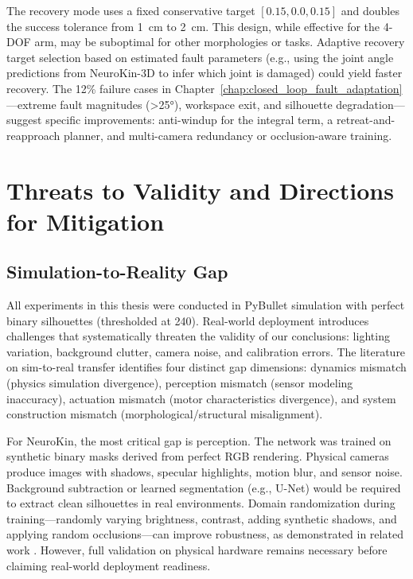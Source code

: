 \documentclass[12pt,a4paper,oneside]{report}
\begin{document}
The recovery mode uses a fixed conservative target $[0.15, 0.0, 0.15]$ and doubles the success tolerance from 1~cm to 2~cm. This design, while effective for the 4-DOF arm, may be suboptimal for other morphologies or tasks. Adaptive recovery target selection based on estimated fault parameters (e.g., using the joint angle predictions from NeuroKin-3D to infer which joint is damaged) could yield faster recovery. The 12\% failure cases in Chapter~\ref{chap:closed_loop_fault_adaptation}---extreme fault magnitudes (>25°), workspace exit, and silhouette degradation---suggest specific improvements: anti-windup for the integral term, a retreat-and-reapproach planner, and multi-camera redundancy or occlusion-aware training.
\section{Threats to Validity and Directions for Mitigation}
\subsection{Simulation-to-Reality Gap}
\label{subsec:simulation_to_reality_gap}

All experiments in this thesis were conducted in PyBullet simulation with perfect binary silhouettes (thresholded at 240). Real-world deployment introduces challenges that systematically threaten the validity of our conclusions: lighting variation, background clutter, camera noise, and calibration errors. The literature on sim-to-real transfer \cite{tan2018simtoreal, aljalbout2026realitygap} identifies four distinct gap dimensions: dynamics mismatch (physics simulation divergence), perception mismatch (sensor modeling inaccuracy), actuation mismatch (motor characteristics divergence), and system construction mismatch (morphological/structural misalignment).

For NeuroKin, the most critical gap is perception. The network was trained on synthetic binary masks derived from perfect RGB rendering. Physical cameras produce images with shadows, specular highlights, motion blur, and sensor noise. Background subtraction or learned segmentation (e.g., U-Net) would be required to extract clean silhouettes in real environments. Domain randomization during training---randomly varying brightness, contrast, adding synthetic shadows, and applying random occlusions---can improve robustness, as demonstrated in related work \cite{rezvani2024robust, qiu2024swim2real}. However, full validation on physical hardware remains necessary before claiming real-world deployment readiness.
\end{document}
